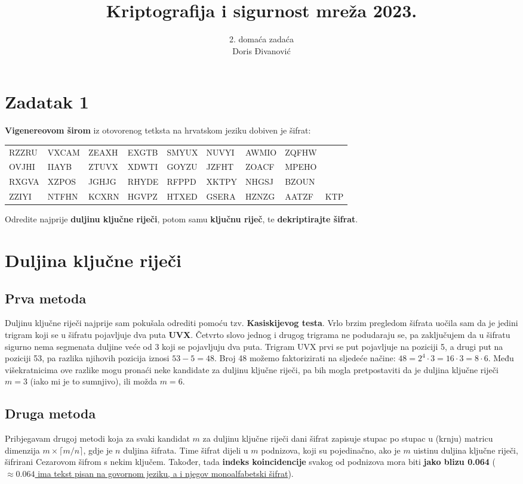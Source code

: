 \documentclass[a4paper,12pt,oneside]{article}
\title{Kriptografija i sigurnost mreža 2023.}
\author{ 2. domaća zadaća \\ Doris Đivanović }
\date{}
\newcommand{\ceil}[1]{\lceil {#1} \rceil}
\begin{document}
	\maketitle
\section*{Zadatak 1}
\textbf{Vigenereovom širom} iz otovorenog tetksta na hrvatskom jeziku dobiven je šifrat:

\begin{table}[h!]
\begin{tabular}{lllllllll}
RZZRU & VXCAM & ZEAXH & EXGTB & SMYUX & NUVYI & AWMIO & ZQFHW & \\
OVJHI & IIAYB & ZTUVX & XDWTI & GOYZU & JZFHT & ZOACF & MPEHO & \\
RXGVA & XZPOS & JGHJG & RHYDE & RFPPD & XKTPY & NHGSJ & BZOUN & \\
ZZIYI & NTFHN & KCXRN & HGVPZ & HTXED & GSERA & HZNZG & AATZF & KTP \\
\end{tabular}
\end{table}

\noindent Odredite najprije \textbf{duljinu ključne riječi}, potom samu \textbf{ključnu riječ}, te
\textbf{dekriptirajte šifrat}.	

\section*{Duljina ključne riječi}
\subsection*{Prva metoda}
Duljinu ključne riječi najprije sam pokušala odrediti pomoću tzv. \textbf{Kasiskijevog testa}. Vrlo brzim pregledom šifrata uočila sam da je jedini trigram koji se u šifratu pojavljuje dva puta \textbf{UVX}. Četvrto slovo jednog i drugog trigrama ne podudaraju se, pa zaključujem da u šifratu sigurno nema segmenata duljine veće od 3 koji se pojavljuju dva puta. Trigram UVX prvi se put pojavljuje na poziciji 5, a drugi put na poziciji 53, pa razlika njihovih pozicija iznosi $53 - 5 = 48$. Broj 48 možemo faktorizirati na sljedeće načine: $48 = 2^4 \cdot 3 = 16 \cdot 3 = 8 \cdot 6$. Među višekratnicima ove razlike mogu pronaći neke kandidate za duljinu ključne riječi, pa bih mogla pretpostaviti da je duljina ključne riječi $m = 3$ (iako mi je to sumnjivo), ili možda $m = 6$.
\subsection*{Druga metoda}
Pribjegavam drugoj metodi koja za svaki kandidat $m$ za duljinu ključne riječi dani šifrat zapisuje stupac po stupac  u (krnju) matricu dimenzija $m \times \ceil{m/n}$, gdje je $n$ duljina šifrata. Time šifrat dijeli u $m$ podnizova, koji su pojedinačno, ako je $m$ uistinu duljina ključne riječi, šifrirani Cezarovom šifrom s nekim ključem. Također, tada \textbf{indeks koincidencije} svakog od podnizova mora biti \textbf{jako blizu 0.064} (\underline{$\approx 0.064$ ima tekst pisan na govornom jeziku, a i njegov monoalfabetski šifrat}).
\end{document}
